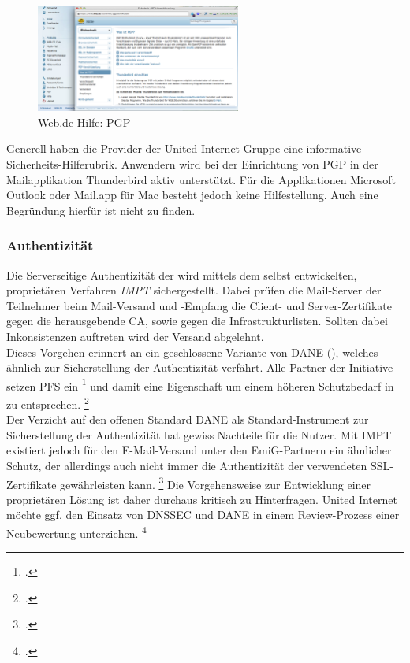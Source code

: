 \documentclass  [paper=a4,
				fontsize=12pt,
				listof=totoc,
				bibliography=totoc
				]{scrreprt}
\begin{document}
			\begin{figure} %
				\vspace{-12pt}
				\centering
				\includegraphics[width=0.6\textwidth]{images/Web-de_Hilfe_PGP}
				\caption[Web.de PGP]{Web.de Hilfe: PGP} 
				\label{fig:Web-de_Hilfe_PGP} %
				\vspace{-24pt}
			\end{figure}
			Generell haben die Provider der United Internet Gruppe eine informative Sicherheits-Hilferubrik.
			Anwendern wird bei der Einrichtung von \ac{PGP} in der Mailapplikation Thunderbird aktiv unterstützt.
			Für die Applikationen Microsoft Outlook oder Mail.app für Mac besteht jedoch keine Hilfestellung.
			Auch eine Begründung hierfür ist nicht zu finden.
		\subsubsection{Authentizität}
		\label{subsubsec:emig-auth}	
			Die Serverseitige Authentizität der wird mittels dem selbst entwickelten, proprietären Verfahren \textit{\ac{IMPT}} sichergestellt. 
			Dabei prüfen die Mail-Server der Teilnehmer beim Mail-Versand und -Empfang die Client- und Server-Zertifikate gegen die herausgebende \ac{CA}, sowie gegen die Infrastrukturlisten.
			Sollten dabei Inkonsistenzen auftreten wird der Versand abgelehnt.\\
			Dieses Vorgehen erinnert an ein geschlossene Variante von \ac{DANE} (), welches ähnlich zur Sicherstellung der Authentizität verfährt.
			Alle Partner der Initiative setzen \ac{PFS} ein
			\footcite[Vgl.][]{Zivadino14-1}
			und damit eine Eigenschaft um einem höheren Schutzbedarf in zu entsprechen.
			\footcite[Vgl.][]{Zivadino14-2} 
			\medskip\\
			Der Verzicht auf den offenen Standard \ac{DANE} als Standard-Instrument zur Sicherstellung der Authentizität hat gewiss Nachteile für die Nutzer. 
			Mit \acl{IMPT} existiert jedoch für den E-Mail-Versand unter den \ac{EmiG}-Partnern ein ähnlicher Schutz, der allerdings auch nicht immer die Authentizität der verwendeten \ac{SSL}-Zertifikate gewährleisten kann.
			\footcite[Vgl.][]{Zivadino14-1}
			Die Vorgehensweise zur Entwicklung einer proprietären Lösung ist daher durchaus kritisch zu Hinterfragen. 
			United Internet möchte ggf. den Einsatz von \ac{DNSSEC} und \ac{DANE} in einem Review-Prozess einer Neubewertung unterziehen.
			\footcite[Vgl.][]{Zivadino14-2}
\end{document}
